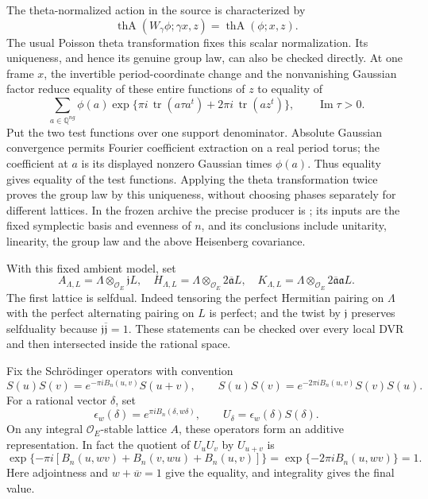 The theta-normalized action in the source is characterized by
\[
 \operatorname{thA}(W_\gamma\phi;\gamma x,z)
                         =\operatorname{thA}(\phi;x,z).
\]
The usual Poisson theta transformation fixes this scalar
normalization.  Its uniqueness, and hence its genuine group law,
can also be checked directly.  At one frame \(x\), the invertible
period-coordinate change and the nonvanishing Gaussian factor
reduce equality of these entire functions of \(z\) to equality of
\[
 \sum_{a\in\mathbb Q^{ng}}
       \phi(a)\exp\{\pi i\,\operatorname{tr}(a\tau a^t)
                              +2\pi i\,\operatorname{tr}(az^t)\},
 \qquad \operatorname{Im}\tau>0 .
\]
Put the two test functions over one support denominator.
Absolute Gaussian convergence permits Fourier coefficient
extraction on a real period torus; the coefficient at \(a\) is
its displayed nonzero Gaussian times \(\phi(a)\).
Thus equality gives equality of the test functions.
Applying the theta transformation twice proves the group law
by this uniqueness, without choosing phases separately for
different lattices.  In the frozen archive the precise producer
is ;
its inputs are the fixed symplectic basis and evenness of \(n\),
and its conclusions include unitarity, linearity, the group law
and the above Heisenberg covariance.

With this fixed ambient model, set
\[
 A_{\Lambda,L}=\Lambda\otimes_{\mathcal O_E}\mathfrak jL,\quad
 H_{\Lambda,L}=\Lambda\otimes_{\mathcal O_E}
                         2\overline{\mathfrak a}L,\quad
 K_{\Lambda,L}=\Lambda\otimes_{\mathcal O_E}
                         2\overline{\mathfrak a}\mathfrak aL.
\]
The first lattice is selfdual.
Indeed tensoring the perfect Hermitian pairing on \(\Lambda\)
with the perfect alternating pairing on \(L\) is perfect;
and the twist by \(\mathfrak j\) preserves selfduality because
\(\mathfrak j\overline{\mathfrak j}=1\).
These statements can be checked over every local DVR and then
intersected inside the rational space.

Fix the Schr\"odinger operators with convention
\[
 S(u)S(v)=e^{-\pi iB_n(u,v)}S(u+v),\qquad
 S(u)S(v)=e^{-2\pi iB_n(u,v)}S(v)S(u).
\]
For a rational vector \(\delta\), set
\begin{equation}\label{eq:sr-common-eigenoperator}
 \epsilon_w(\delta)=e^{\pi iB_n(\delta,w\delta)},\qquad
 U_\delta=\epsilon_w(\delta)S(\delta).
\end{equation}
On any integral \(\mathcal O_E\)-stable lattice \(A\), these
operators form an additive representation.
In fact the quotient of \(U_uU_v\) by \(U_{u+v}\) is
\[
 \exp\{-\pi i[
 B_n(u,wv)+B_n(v,wu)+B_n(u,v)]\}
       =\exp\{-2\pi iB_n(u,wv)\}=1.
\]
Here adjointness and \(w+\overline w=1\) give the equality,
and integrality gives the final value.

